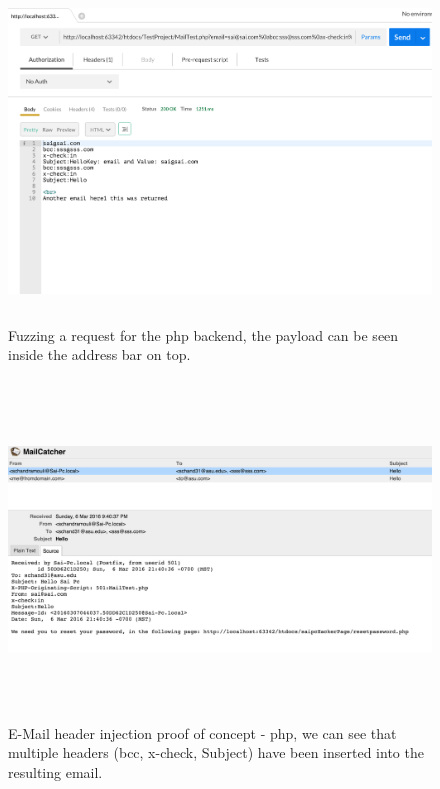\begin{figure}[!htbp]
	\centering
	\includegraphics[width=14cm, height=9cm]{System/EMI_Postman_PHP}
	\caption{Fuzzing a request for the php backend, the payload can be seen inside the address bar on top.}
	\label{fig:postmanphp}
\end{figure}

\begin{figure}[!htbp]
	\centering
	\includegraphics[width=14cm, height=9cm]{System/EMI_Mailcatcher_PHP}
	\caption{E-Mail header injection proof of concept - php, we can see that multiple headers (bcc, x-check, Subject) have been inserted into the resulting email.}
	\label{fig:mailcatcherphp}
\end{figure}